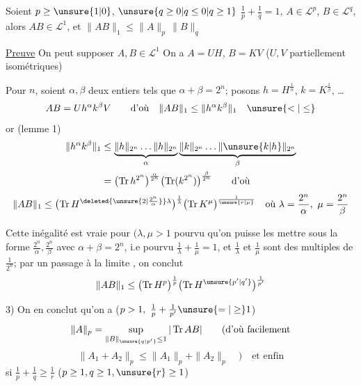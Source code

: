  Soient $p\geq\unsure{1|0}$,
$\unsure{q\geq0|q\leq0|q\geq1}$ \quad $\frac1p+\frac1q=1$,
$A\in\mathcal L^p$, $B\in\mathcal L^q$, alors $AB\in\mathcal L^1$, et
$\|AB\|_1\leq\|A\|_p\,\|B\|_q$

\uline{Preuve} On peut supposer $A,B\in\mathcal L^1$
On a $A=UH$, $B=KV$ ($U,V$ partiellement isométriques)

Pour  $n$, soient $\alpha,\beta$ deux entiers tels que $\alpha+\beta=2^n$;
posons $h=H^{\frac1\alpha}$, $k=K^{\frac1\beta}$, \ldots
\[
AB=Uh^\alpha k^\beta V\qquad\text{d'où}\quad\|AB\|_1\leq\|h^\alpha k^\beta\|_1\quad\unsure{<|\leq}
\]
or (lemme 1)
\[
\begin{aligned}
\|h^\alpha k^\beta\|_1&\leq
\underbrace{\|h\|_{2^n}\ldots\|h\|_{2^n}}_{\alpha}
\underbrace{\|k\|_{2^n}\ldots\|\unsure{k|h}\|_{2^n}}_{\beta}\\
&=\bigl(\operatorname{Tr} h^{2^n}\bigr)^{\frac\alpha{2^n}}
\bigl(\operatorname{Tr}(k^{2^n})\bigr)^{\frac\beta{2^n}}\qquad\text{d'où}
\end{aligned}
\]
\[
\|AB\|_1\leq\bigl(\operatorname{Tr}H^{\deleted{\unsure{2|\frac{2^n}{\alpha}}}\lambda}\bigr)^{\frac1\lambda}
\bigl(\operatorname{Tr}K^\mu\bigr)^{\frac1{\unsure{r|\mu}}}
\quad\text{où }\lambda=\frac{2^n}{\alpha},\ \mu=\frac{2^n}{\beta}
\]

Cette inégalité est vraie pour  $(\lambda,\mu>1$ pourvu qu'on puisse les mettre sous la  forme
$\frac{2^n}{\alpha},\frac{2^n}{\beta}$ avec $\alpha+\beta=2^n$,
i.e pourvu $\frac1\lambda+\frac1\mu=1$, 
et $\frac1\lambda$ et $\frac1\mu$ sont des multiples de $\frac1{2^n}$;
par un passage à la limite , on conclut
\[
\|AB\|_1\leq\bigl(\operatorname{Tr}H^p\bigr)^{\frac1p}
\bigl(\operatorname{Tr}H^{\unsure{p'|q'}}\bigr)^{\frac1{p'}}
\]

3) On en conclut qu'on a ($p>1,\ \frac1p+\frac1{p'}\unsure{=|\geq}1$)
\[
\|A\|_p=\sup_{\|B\|_{\unsure{q|p'}}\leq1}|\operatorname{Tr} AB|\qquad\text{(d'où facilement}
\]
\[
\|A_1+A_2\|_p\leq\|A_1\|_p+\|A_2\|_p\quad)\quad\text{et enfin}
\]
 si $\frac1p+\frac1q\geq\frac1r$ \quad ($p\geq1,q\geq1,\unsure{r}\geq1$)
